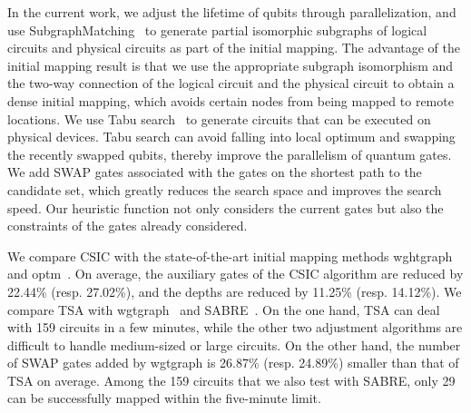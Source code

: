 \documentclass[runningheads]{llncs}
\begin{document}
In the current work, we adjust the lifetime of qubits through parallelization, and use SubgraphMatching~\cite{Sun2020} to generate partial isomorphic subgraphs of logical circuits %
and physical circuits %
as part of the initial mapping. The advantage of the initial mapping result is that we use the appropriate subgraph isomorphism and the two-way connection of the logical circuit and the physical circuit to obtain a dense initial mapping, which avoids certain nodes from being mapped to remote locations. We use Tabu search~\cite{Glover1990} to generate circuits that can be executed on physical devices. Tabu search can avoid falling into local optimum and swapping the recently swapped qubits, thereby improve the parallelism of quantum gates. We add SWAP gates associated with the gates on the shortest path to the candidate set, which greatly reduces the search space and improves the search speed. Our heuristic function not only considers the current gates but also the constraints of the gates already considered.

We compare CSIC with the state-of-the-art initial mapping methods wghtgraph~\cite{2020Qubit} and optm~\cite{Zulehner2017}. On average, the auxiliary gates of the CSIC algorithm are reduced by 22.44\% (resp. 27.02\%), and the depths are reduced by 11.25\% (resp. 14.12\%). We compare TSA with wgtgraph~\cite{2020Qubit} and SABRE~\cite{Li2018}. On the one hand, TSA can deal with 159 circuits in a few minutes, while the  other two adjustment algorithms are difficult to handle medium-sized or large circuits. On the other hand, the number of SWAP gates added by wgtgraph is 26.87\% (resp. 24.89\%) smaller than that of  TSA on average. Among the 159 circuits that we also test with SABRE, only 29  can be successfully mapped within the five-minute limit.
\end{document}
